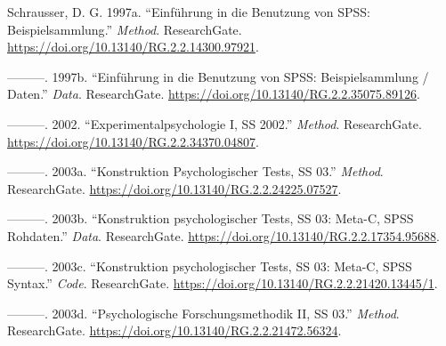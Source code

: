 \documentclass[
]{article}
\author{Dietmar Gerald SCHRAUSSER}
\date{14.04.2026}
\newlength{\cslhangindent}
\newlength{\cslentryspacingunit} %
\newenvironment{CSLReferences}[2] %
 {%
  \setlength{\parindent}{0pt}
  \ifodd #1
  \let\oldpar\par
  \def\par{\hangindent=\cslhangindent\oldpar}
  \fi
  \setlength{\parskip}{#2\cslentryspacingunit}
 }%
 {}
\begin{document}
\hypertarget{refs}{}
\begin{CSLReferences}{1}{0}
\leavevmode{}%
Schrausser, D. G. 1997a. {``{Einführung in die Benutzung von SPSS:
Beispielsammlung}.''} \emph{Method}. ResearchGate.
\url{https://doi.org/10.13140/RG.2.2.14300.97921}.

\leavevmode{}%
---------. 1997b. {``{Einführung in die Benutzung von SPSS:
Beispielsammlung / Daten}.''} \emph{Data}. ResearchGate.
\url{https://doi.org/10.13140/RG.2.2.35075.89126}.

\leavevmode{}%
---------. 2002. {``{Experimentalpsychologie I, SS 2002}.''}
\emph{Method}. ResearchGate.
\url{https://doi.org/10.13140/RG.2.2.34370.04807}.

\leavevmode{}%
---------. 2003a. {``Konstruktion Psychologischer Tests, SS 03.''}
\emph{Method}. ResearchGate.
\url{https://doi.org/10.13140/RG.2.2.24225.07527}.

\leavevmode{}%
---------. 2003b. {``{Konstruktion psychologischer Tests, SS 03: Meta-C,
SPSS Rohdaten}.''} \emph{Data}. ResearchGate.
\url{https://doi.org/10.13140/RG.2.2.17354.95688}.

\leavevmode{}%
---------. 2003c. {``{Konstruktion psychologischer Tests, SS 03: Meta-C,
SPSS Syntax}.''} \emph{Code}. ResearchGate.
\url{https://doi.org/10.13140/RG.2.2.21420.13445/1}.

\leavevmode{}%
---------. 2003d. {``{Psychologische Forschungsmethodik II, SS 03}.''}
\emph{Method}. ResearchGate.
\url{https://doi.org/10.13140/RG.2.2.21472.56324}.

\end{CSLReferences}
\end{document}
